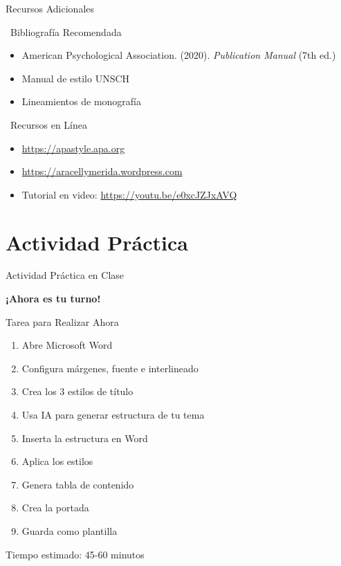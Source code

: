 \documentclass[aspectratio=169,11pt]{beamer}
\begin{document}
\begin{frame}{Recursos Adicionales}
  \begin{block}{\faBook\ Bibliografía Recomendada}
    \begin{itemize}
      \item American Psychological Association. (2020). \textit{Publication Manual} (7th ed.)
      \item Manual de estilo UNSCH
      \item Lineamientos de monografía
    \end{itemize}
  \end{block}
  
  \begin{block}{\faGlobe\ Recursos en Línea}
    \begin{itemize}
      \item \url{https://apastyle.apa.org}
      \item \url{https://aracellymerida.wordpress.com}
      \item Tutorial en video: \url{https://youtu.be/e0xcJZJxAVQ}
    \end{itemize}
  \end{block}
\end{frame}

\section{Actividad Práctica}

\begin{frame}{Actividad Práctica en Clase}
  \begin{center}
    \Large \textbf{¡Ahora es tu turno!}
  \end{center}
  
  \vspace{0.5cm}
  
  \begin{block}{Tarea para Realizar Ahora}
    \begin{enumerate}
      \item Abre Microsoft Word
      \item Configura márgenes, fuente e interlineado
      \item Crea los 3 estilos de título
      \item Usa IA para generar estructura de tu tema
      \item Inserta la estructura en Word
      \item Aplica los estilos
      \item Genera tabla de contenido
      \item Crea la portada
      \item Guarda como plantilla
    \end{enumerate}
  \end{block}
  
  \begin{warningbox}
    Tiempo estimado: 45-60 minutos
  \end{warningbox}
\end{frame}
\end{document}
